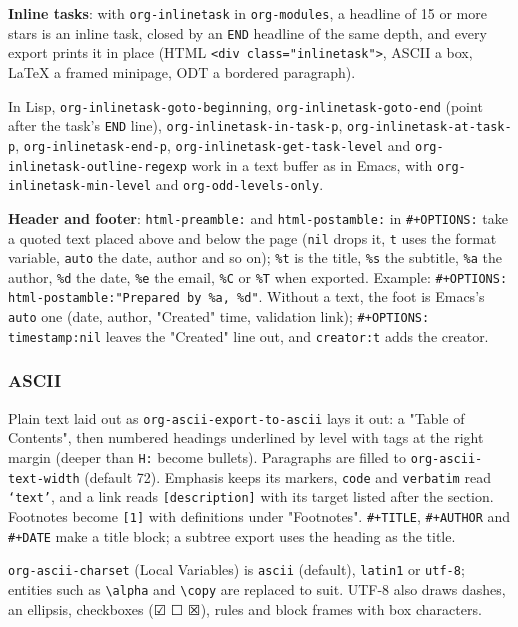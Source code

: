 \documentclass[11pt]{article}
\begin{document}
\textbf{Inline tasks}: with \texttt{org-inlinetask} in \texttt{org-modules}, a headline of 15 or more stars is an inline task, closed by an \texttt{END} headline of the same depth, and every export prints it in place (HTML \texttt{<div class="inlinetask">}, ASCII a box, \LaTeX{} a framed minipage, ODT a bordered paragraph).

In Lisp, \texttt{org-inlinetask-goto-beginning}, \texttt{org-inlinetask-goto-end} (point after the task's \texttt{END} line), \texttt{org-inlinetask-in-task-p}, \texttt{org-inlinetask-at-task-p}, \texttt{org-inlinetask-end-p}, \texttt{org-inlinetask-get-task-level} and \texttt{org-inlinetask-outline-regexp} work in a text buffer as in Emacs, with \texttt{org-inlinetask-min-level} and \texttt{org-odd-levels-only}.

\textbf{Header and footer}: \texttt{html-preamble:} and \texttt{html-postamble:} in \texttt{\#+OPTIONS:} take a quoted text placed above and below the page (\texttt{nil} drops it, \texttt{t} uses the format variable, \texttt{auto} the date, author and so on); \texttt{\%t} is the title, \texttt{\%s} the subtitle, \texttt{\%a} the author, \texttt{\%d} the date, \texttt{\%e} the email, \texttt{\%C} or \texttt{\%T} when exported. Example: \texttt{\#+OPTIONS: html-postamble:"Prepared by \%a, \%d"}. Without a text, the foot is Emacs's \texttt{auto} one (date, author, "Created" time, validation link); \texttt{\#+OPTIONS: timestamp:nil} leaves the "Created" line out, and \texttt{creator:t} adds the creator.

\subsubsection{ASCII}
\label{sec:org57c0b06}

Plain text laid out as \texttt{org-ascii-export-to-ascii} lays it out: a "Table of Contents", then numbered headings underlined by level with tags at the right margin (deeper than \texttt{H:} become bullets). Paragraphs are filled to \texttt{org-ascii-text-width} (default 72). Emphasis keeps its markers, \texttt{code} and \texttt{verbatim} read \texttt{`text'}, and a link reads \texttt{[description]} with its target listed after the section. Footnotes become \texttt{[1]} with definitions under "Footnotes". \texttt{\#+TITLE}, \texttt{\#+AUTHOR} and \texttt{\#+DATE} make a title block; a subtree export uses the heading as the title.

\texttt{org-ascii-charset} (Local Variables) is \texttt{ascii} (default), \texttt{latin1} or \texttt{utf-8}; entities such as \texttt{\textbackslash{}alpha} and \texttt{\textbackslash{}copy} are replaced to suit. UTF-8 also draws dashes, an ellipsis, checkboxes (☑ ☐ ☒), rules and block frames with box characters.
\end{document}

